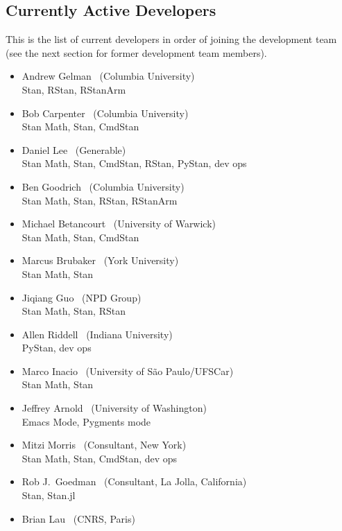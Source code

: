 \subsection*{Currently Active Developers}

This is the list of current developers in order of joining the
development team (see the next section for former development team
members).

\begin{itemize}
\item Andrew Gelman \ (Columbia University)
\\ {\footnotesize Stan, RStan, RStanArm}
\item Bob Carpenter \ (Columbia University) \\ {\footnotesize Stan
    Math, Stan, CmdStan}
\item Daniel Lee \   (Generable)
\\ {\footnotesize Stan Math, Stan, CmdStan, RStan, PyStan, dev ops}
\item Ben Goodrich \   (Columbia University)
\\ {\footnotesize Stan Math, Stan, RStan, RStanArm}
\item Michael Betancourt \ (University of Warwick) \\
  {\footnotesize Stan Math, Stan, CmdStan}
\item Marcus Brubaker \   (York University)
\\ {\footnotesize Stan Math, Stan}
\item Jiqiang Guo \   (NPD Group)
\\ {\footnotesize Stan Math, Stan, RStan}
\item Allen Riddell \   (Indiana University)
\\ {\footnotesize PyStan, dev ops}
\item Marco Inacio \   (University of S\~{a}o Paulo/UFSCar)
\\ {\footnotesize Stan Math, Stan}
\item Jeffrey Arnold \   (University of Washington)
\\ {\footnotesize Emacs Mode, Pygments mode}
\item Mitzi Morris \   (Consultant, New York)
\\ {\footnotesize Stan Math, Stan, CmdStan, dev ops}
\item Rob J.\ Goedman \ (Consultant, La Jolla, California)
\\ {\footnotesize Stan, Stan.jl}
\item Brian Lau \ (CNRS, Paris)

\end{itemize}
